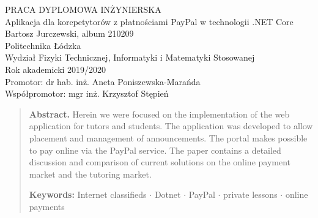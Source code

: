 \documentclass[12pt]{article}
\numberwithin{figure}{section}
\begin{document}
\begin{sloppypar}
\begin{titlepage}
 \thispagestyle{empty}
 \begin{center}
  \vspace{3cm}
  \large
    PRACA DYPLOMOWA INŻYNIERSKA\\
  \vspace{4cm}
  \Huge
    Aplikacja dla korepetytorów z płatnościami PayPal w technologii .NET Core\\
  \large
  \vspace{2cm}
  Bartosz Jurczewski, album 210209\\
  \bigbreak
  Politechnika Łódzka\\
  Wydział Fizyki Technicznej, Informatyki i Matematyki Stosowanej\\
  Rok akademicki 2019/2020\\
  \bigbreak
   Promotor: dr hab. inż. Aneta Poniszewska-Marańda \\
   Współpromotor: mgr inż. Krzysztof Stępień\\
 \end{center}
\end{titlepage}

\clearpage
{}
\setcounter{page}{2}
\setcounter{secnumdepth}{3}

\tableofcontents
\pagebreak

\begin{abstract}

\textbf{Abstract.}
Herein we were focused on the implementation of the web application for tutors and students.
The application was developed to allow placement and management of announcements. The portal makes possible to pay online via the PayPal service. The paper contains a detailed discussion and comparison of current solutions on the online payment market and the tutoring market.

\textbf{Keywords:}
Internet classifieds $\cdot$ Dotnet $\cdot$ PayPal $\cdot$ private lessons $\cdot$ online payments

\end{abstract}
\begin{abstract}
    

\end{abstract}
\end{sloppypar}
\end{document}
